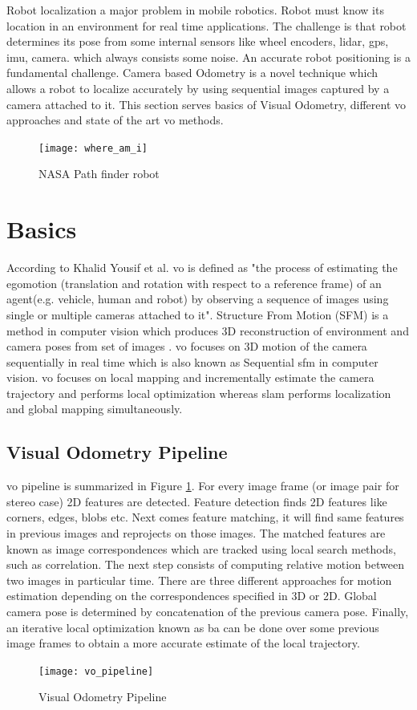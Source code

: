 Robot localization a major problem in mobile robotics. Robot must know its location in an environment for real time applications. The challenge is that robot determines its pose from some internal sensors like wheel encoders, \acrshort{lidar}, \acrshort{gps}, \acrshort{imu}, camera. which always consists some noise. An accurate robot positioning is a fundamental challenge. Camera based Odometry is a novel technique which allows a robot to localize accurately by using sequential images captured by a camera attached to it. This section serves basics of Visual Odometry, different \acrshort{vo} approaches and state of the art \acrshort{vo} methods.\\
\begin{figure}[h]
	\centering
	\texttt{[image: where\_am\_i]}
	\caption{NASA Path finder robot\cite{nasa}}
\end{figure}
\section{Basics}
According to Khalid Yousif et al.\cite{KhalidYousif-et-al-2015} \acrshort{vo} is defined as "the process of estimating the egomotion (translation and rotation with respect to a reference frame) of an agent(e.g. vehicle, human and robot) by observing a sequence of images using single or multiple cameras attached to it". Structure From Motion (SFM) is a method in computer vision which produces 3D reconstruction of environment and camera poses from set of images \cite{ScaramuzzaVO}. \acrshort{vo} focuses on 3D motion of the camera sequentially in real time which is also known as Sequential \acrshort{sfm} in computer vision. \acrshort{vo} focuses on local mapping and incrementally estimate the camera trajectory and performs local optimization whereas \acrshort{slam} performs localization and global mapping simultaneously.

\subsection{Visual Odometry Pipeline}
\acrshort{vo} pipeline is summarized in Figure \ref{fig:flow}. For every image frame (or image pair for stereo case) 2D features are detected. Feature detection finds 2D features like corners, edges, blobs etc. Next comes feature matching, it will find same features in previous images and reprojects on those images. The matched features are known as image correspondences which are tracked using local search methods, such as correlation. The next step consists of computing relative motion between two images in particular time. There are three different approaches for motion estimation depending on the correspondences specified in 3D or 2D. Global camera pose is determined by concatenation of the previous camera pose. Finally, an iterative local optimization known as \acrshort{ba} can be done over some previous image frames to obtain a more accurate estimate of the local trajectory.
\begin{figure}[h]
	\centering
	\texttt{[image: vo\_pipeline]}
	\caption{Visual Odometry Pipeline}
	\label{fig:flow}
\end{figure}
